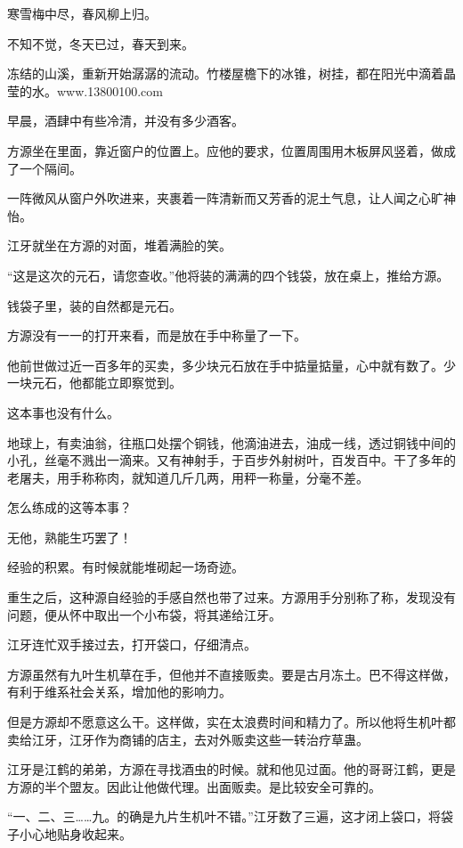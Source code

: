 
\begin{this_body}

寒雪梅中尽，春风柳上归。

不知不觉，冬天已过，春天到来。

冻结的山溪，重新开始潺潺的流动。竹楼屋檐下的冰锥，树挂，都在阳光中滴着晶莹的水。www.13800100.com

早晨，酒肆中有些冷清，并没有多少酒客。

方源坐在里面，靠近窗户的位置上。应他的要求，位置周围用木板屏风竖着，做成了一个隔间。

一阵微风从窗户外吹进来，夹裹着一阵清新而又芳香的泥土气息，让人闻之心旷神怡。

江牙就坐在方源的对面，堆着满脸的笑。

“这是这次的元石，请您查收。”他将装的满满的四个钱袋，放在桌上，推给方源。

钱袋子里，装的自然都是元石。

方源没有一一的打开来看，而是放在手中称量了一下。

他前世做过近一百多年的买卖，多少块元石放在手中掂量掂量，心中就有数了。少一块元石，他都能立即察觉到。

这本事也没有什么。

地球上，有卖油翁，往瓶口处摆个铜钱，他滴油进去，油成一线，透过铜钱中间的小孔，丝毫不溅出一滴来。又有神射手，于百步外射树叶，百发百中。干了多年的老屠夫，用手称称肉，就知道几斤几两，用秤一称量，分毫不差。

怎么练成的这等本事？

无他，熟能生巧罢了！

经验的积累。有时候就能堆砌起一场奇迹。

重生之后，这种源自经验的手感自然也带了过来。方源用手分别称了称，发现没有问题，便从怀中取出一个小布袋，将其递给江牙。

江牙连忙双手接过去，打开袋口，仔细清点。

方源虽然有九叶生机草在手，但他并不直接贩卖。要是古月冻土。巴不得这样做，有利于维系社会关系，增加他的影响力。

但是方源却不愿意这么干。这样做，实在太浪费时间和精力了。所以他将生机叶都卖给江牙，江牙作为商铺的店主，去对外贩卖这些一转治疗草蛊。

江牙是江鹤的弟弟，方源在寻找酒虫的时候。就和他见过面。他的哥哥江鹤，更是方源的半个盟友。因此让他做代理。出面贩卖。是比较安全可靠的。

“一、二、三……九。的确是九片生机叶不错。”江牙数了三遍，这才闭上袋口，将袋子小心地贴身收起来。


\end{this_body}
